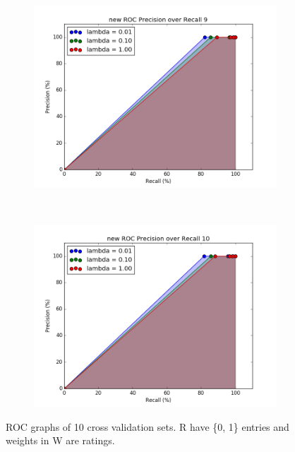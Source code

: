\documentclass[12pt]{article}
\begin{document}
\begin{figure}[h!]
\ContinuedFloat     
    \begin{subfigure}[t]{0.5\textwidth}
        \centering
        \includegraphics[width=1.\textwidth]{graphs/problem4_ROC9}
        \caption{}
    \end{subfigure}%
    ~ 
    \begin{subfigure}[t]{0.5\textwidth}
        \centering
        \includegraphics[width=1.\textwidth]{graphs/problem4_ROC10}
        \caption{}
    \end{subfigure}%
  
    \caption{ROC graphs of 10 cross validation sets. R have \{0, 1\} entries and weights in W are ratings.}
\end{figure}
\end{document}
